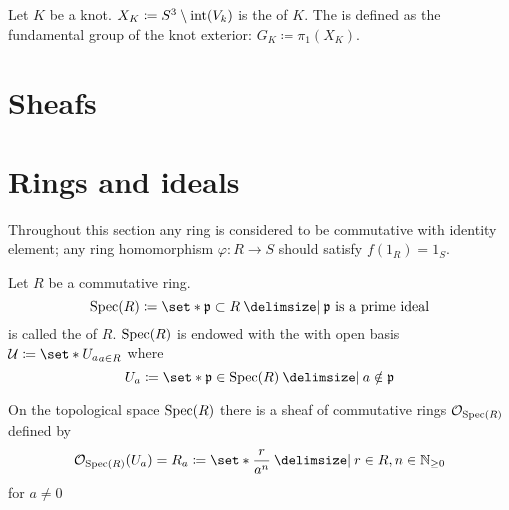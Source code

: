 \begin{definition}
	Let $K$ be a knot. $X_K \coloneqq S^3 \setminus \operatorname{int}(V_k)$ is the  of $K$.
	The  is defined as the fundamental group of the knot exterior: $G_K \coloneqq \pi_1(X_K)$.
\end{definition}

\section{Sheafs} %
\label{sec:sheafs}



\section{Rings and ideals} %
\label{sec:rings_and_ideals}
Throughout this section any ring is considered to be commutative with identity element; any ring homomorphism $\varphi \colon R \to S$ should satisfy $f(1_R) =1_S$.


\begin{definition}
	Let $R$ be a commutative ring. 
	\[
		\Spec(R) \coloneqq \set*{\mathfrak{p} \subset R \given \mathfrak{p} \text{ is a prime ideal} }
	\]
	is called the  of $R$.
	$\operatorname{Spec}(R)$ is endowed with the  with open basis $\mathcal{U} \coloneqq \set*{U_a}_{a \in R}$ where
	\[
		U_a \coloneqq \set*{\mathfrak{p} \in \Spec(R) \given a \notin \mathfrak{p}}
	\] 
\end{definition}

On the topological space $\operatorname{Spec}(R)$ there is a sheaf of commutative rings $\mathcal{O}_{\operatorname{Spec}(R)}$ defined by
\[
	\mathcal{O}_{\Spec(R)}(U_a) = R_a \coloneqq \set*{\frac{r}{a^n} \given r \in R, n \in \mathbb{N}_{\ge 0}}
\]
for $a \neq 0$



\cleardoubleoddemptypage
{}
\setcounter{page}{1}
\appendix
\printbibliography
\printindex
\todototoc
\listoftodos[To-do's]
